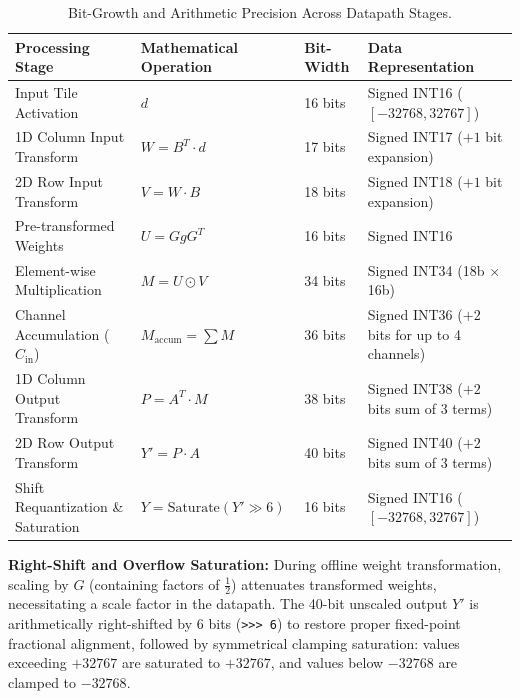 \documentclass[12pt,a4paper]{article}
\begin{document}
\begin{table}[htbp]
    \centering
    \caption{Bit-Growth and Arithmetic Precision Across Datapath Stages.}
    \label{tab:bit_growth}
    \small
    \begin{tabularx}{\textwidth}{lXll}
        \toprule
        \textbf{Processing Stage} & \textbf{Mathematical Operation} & \textbf{Bit-Width} & \textbf{Data Representation} \\
        \midrule
        Input Tile Activation        & $d$                             & 16 bits            & Signed INT16 ($[-32768, 32767]$) \\
        1D Column Input Transform    & $W = B^T \cdot d$               & 17 bits            & Signed INT17 ($+1$ bit expansion) \\
        2D Row Input Transform       & $V = W \cdot B$                 & 18 bits            & Signed INT18 ($+1$ bit expansion) \\
        Pre-transformed Weights      & $U = G g G^T$                   & 16 bits            & Signed INT16 \\
        Element-wise Multiplication  & $M = U \odot V$                 & 34 bits            & Signed INT34 (18b $\times$ 16b) \\
        Channel Accumulation ($C_{\text{in}}$) & $M_{\text{accum}} = \sum M$ & 36 bits      & Signed INT36 ($+2$ bits for up to 4 channels) \\
        1D Column Output Transform   & $P = A^T \cdot M$               & 38 bits            & Signed INT38 ($+2$ bits sum of 3 terms) \\
        2D Row Output Transform      & $Y' = P \cdot A$                & 40 bits            & Signed INT40 ($+2$ bits sum of 3 terms) \\
        Shift Requantization \& Saturation & $Y = \text{Saturate}(Y' \gg 6)$ & 16 bits     & Signed INT16 ($[-32768, 32767]$) \\
        \bottomrule
    \end{tabularx}
\end{table}

\noindent\textbf{Right-Shift and Overflow Saturation:} During offline weight transformation, scaling by $G$ (containing factors of $\frac{1}{2}$) attenuates transformed weights, necessitating a scale factor in the datapath. The 40-bit unscaled output $Y'$ is arithmetically right-shifted by 6 bits (\texttt{>>> 6}) to restore proper fixed-point fractional alignment, followed by symmetrical clamping saturation: values exceeding $+32767$ are saturated to $+32767$, and values below $-32768$ are clamped to $-32768$.
\end{document}
